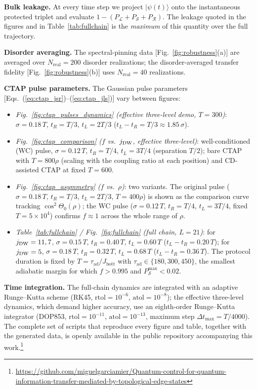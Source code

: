 \documentclass[
  reprint,
  amsmath,
  amssymb,
  aps,
  prb,
  floatfix,
  longbibliography,
]{revtex4-2}
\begin{document}
\textbf{Bulk leakage.}
At every time step we project $|\psi(t)\rangle$ onto the instantaneous protected
triplet and evaluate
$1-(P_{\mathcal{L}}+P_{\mathcal{S}}+P_{\mathcal{R}})$. The leakage quoted in the
figures and in Table~\ref{tab:fullchain} is the \emph{maximum} of this quantity
over the full trajectory.

\textbf{Disorder averaging.}
The spectral-pinning data [Fig.~\ref{fig:robustness}(a)] are averaged over
$N_{\mathrm{real}}=200$ disorder realizations; the disorder-averaged transfer
fidelity [Fig.~\ref{fig:robustness}(b)] uses $N_{\mathrm{real}}=40$
realizations.

\textbf{CTAP pulse parameters.}
The Gaussian pulse parameters [Eqs.~(\ref{eq:ctap_jsr})--(\ref{eq:ctap_jls})]
vary between figures:
\begin{itemize}
  \item \emph{Fig.~\ref{fig:ctap_pulses_dynamics} (effective three-level demo,
    $T=300$)}: $\sigma=0.18\,T$, $t_R=T/3$, $t_L=2T/3$
    ($t_L-t_R=T/3\approx1.85\,\sigma$).
  \item \emph{Fig.~\ref{fig:ctap_comparison} ($f$ vs.\ $j_{\rm DW}$,
    effective three-level)}: well-conditioned (WC) pulse, $\sigma=0.12\,T$,
    $t_R=T/4$, $t_L=3T/4$ (separation $T/2$); bare CTAP with $T=800\rho$
    (scaling with the coupling ratio at each position) and CD-assisted CTAP at
    fixed $T=600$.
  \item \emph{Fig.~\ref{fig:ctap_asymmetry} ($f$ vs.\ $\rho$)}: two variants.
    The original pulse ($\sigma=0.18\,T$, $t_R=T/3$, $t_L=2T/3$, $T=400\rho$) is
    shown as the comparison curve tracking $\cos^2\Theta_0(\rho)$; the WC pulse
    ($\sigma=0.12\,T$, $t_R=T/4$, $t_L=3T/4$, fixed $T=5\times10^{4}$) confirms
    $f\approx1$ across the whole range of $\rho$.
  \item \emph{Table~\ref{tab:fullchain} / Fig.~\ref{fig:fullchain} (full chain,
    $L=21$)}: for $j_{\rm DW}=11,7$, $\sigma=0.15\,T$, $t_R=0.40\,T$,
    $t_L=0.60\,T$ ($t_L-t_R=0.20\,T$); for $j_{\rm DW}=5$, $\sigma=0.18\,T$,
    $t_R=0.32\,T$, $t_L=0.68\,T$ ($t_L-t_R=0.36\,T$). The protocol duration is
    fixed by $T=\tau_{\mathrm{ad}}/J_{\mathrm{bott}}$ with
    $\tau_{\mathrm{ad}}\in\{180,300,450\}$, the smallest adiabatic margin for
    which $f>0.995$ and $P_{\mathcal{S}}^{\max}<0.02$.
\end{itemize}

\textbf{Time integration.}
The full-chain dynamics are integrated with an adaptive Runge--Kutta scheme
(RK45, $\mathrm{rtol}=10^{-6}$, $\mathrm{atol}=10^{-8}$); the effective
three-level dynamics, which demand higher accuracy, use an eighth-order
Runge--Kutta integrator (DOP853, $\mathrm{rtol}=10^{-11}$,
$\mathrm{atol}=10^{-13}$, maximum step $\Delta t_{\max}=T/4000$). The complete
set of scripts that reproduce every figure and table, together with the
generated data, is openly available in the public repository accompanying this
work.\footnote{\url{https://github.com/miguelgarciamier/Quantum-control-for-quantum-information-transfer-mediated-by-topological-edge-states}}
\end{document}
